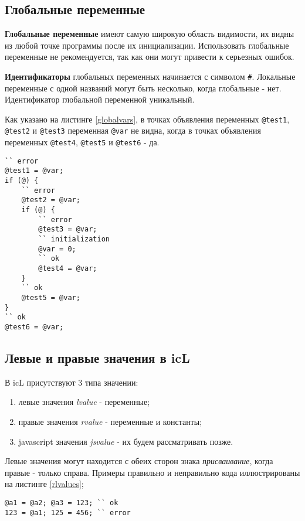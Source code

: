 \documentclass[a4paper, 14pt]{extarticle}
\newenvironment{icEnum}
	{ \begin{enumerate}[noitemsep,nolistsep] }
	{ \end{enumerate} }
\begin{document}
\subsection{Глобальные переменные}

	\textbf{Глобальные переменные} имеют самую широкую область видимости, их видны из любой точке программы после их инициализации. Использовать глобальные переменные не рекомендуется, так как они могут привести к серьезных ошибок. 
	
	{\bf Идентификаторы} глобальных переменных начинается с символом {\color{blue2}\lstinline`#`}. Локальные переменные с одной названий могут быть несколько, когда глобальные - нет. Идентификатор глобальной переменной уникальный.
	
	Как указано на листинге \ref{globalvars}, в точках объявления переменных \lstinline`@test1`, \lstinline`@test2` и \lstinline`@test3` переменная \lstinline`@var` не видна, когда в точках объявления переменных \lstinline`@test4`, \lstinline`@test5` и \lstinline`@test6` - да.
	
\begin{lstlisting}[caption=Область видимости глобальных перемен, label=globalvars]
`` error
@test1 = @var;
if (@) {
	`` error
	@test2 = @var; 
	if (@) {
		`` error
		@test3 = @var;
		`` initialization
		@var = 0;
		`` ok
		@test4 = @var;
	}
	`` ok
	@test5 = @var; 
}
`` ok
@test6 = @var;
\end{lstlisting}

\subsection{Левые и правые значения в icL}

	В icL присутствуют 3 типа значении:
\begin{icEnum}
	\item левые значения {\it lvalue} - переменные;
	\item правые значения {\it rvalue} - переменные и константы;
	\item javascript значения {\it jsvalue} - их будем рассматривать позже.
\end{icEnum}
	
	Левые значения могут находится с обеих сторон знака {\it присваивание}, когда правые - только справа. Примеры правильно и неправильно кода иллюстрированы на листинге \ref{rlvalues};
\begin{lstlisting}[caption=Левые и правые значения, label=rlvalues]
@a1 = @a2; @a3 = 123; `` ok
123 = @a1; 125 = 456; `` error 
\end{lstlisting}
\end{document}

